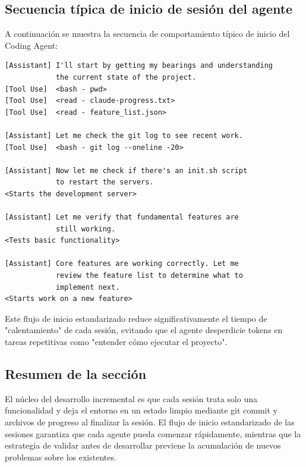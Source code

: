 \subsection{Secuencia típica de inicio de sesión del agente}

A continuación se muestra la secuencia de comportamiento típico de inicio del Coding Agent:

\begin{lstlisting}[language={}, caption={Flujo típico de inicio de sesión del Coding Agent}]
[Assistant] I'll start by getting my bearings and understanding
            the current state of the project.
[Tool Use]  <bash - pwd>
[Tool Use]  <read - claude-progress.txt>
[Tool Use]  <read - feature_list.json>

[Assistant] Let me check the git log to see recent work.
[Tool Use]  <bash - git log --oneline -20>

[Assistant] Now let me check if there's an init.sh script
            to restart the servers.
<Starts the development server>

[Assistant] Let me verify that fundamental features are
            still working.
<Tests basic functionality>

[Assistant] Core features are working correctly. Let me
            review the feature list to determine what to
            implement next.
<Starts work on a new feature>
\end{lstlisting}

Este flujo de inicio estandarizado reduce significativamente el tiempo de "calentamiento" de cada sesión, evitando que el agente desperdicie tokens en tareas repetitivas como "entender cómo ejecutar el proyecto".

\subsection{Resumen de la sección}

El núcleo del desarrollo incremental es que cada sesión trata solo una funcionalidad y deja el entorno en un estado limpio mediante git commit y archivos de progreso al finalizar la sesión. El flujo de inicio estandarizado de las sesiones garantiza que cada agente pueda comenzar rápidamente, mientras que la estrategia de validar antes de desarrollar previene la acumulación de nuevos problemas sobre los existentes.
